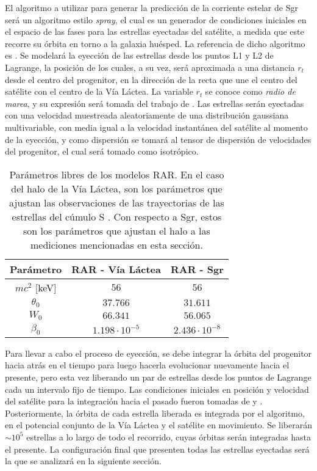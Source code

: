\documentclass[baaa]{baaa}
\begin{document}
El algoritmo a utilizar para generar la predicción de la corriente estelar de Sgr será un algoritmo estilo \textit{spray},  el cual es un generador de condiciones iniciales en el espacio de las fases para las estrellas eyectadas del satélite, a medida que este recorre su órbita en torno a la galaxia huésped. La referencia de dicho algoritmo es \cite{Gibbons2014}. Se modelará la eyección de las estrellas desde los puntos L1 y L2 de Lagrange, la posición de los cuales, a su vez, será aproximada a una distancia $r_{t}$ desde el centro del progenitor, en la dirección de la recta que une el centro del satélite con el centro de la Vía Láctea. La variable $r_{t}$ se conoce como \textit{radio de marea}, y su expresión será tomada del trabajo de \cite{Gajda2016}. Las estrellas serán eyectadas con una velocidad muestreada aleatoriamente de una distribución gaussiana multivariable, con media igual a la velocidad instantánea del satélite al momento de la eyección, y como dispersión se tomará al tensor de dispersión de velocidades del progenitor, el cual será tomado como isotrópico.

\begin{table}
    \centering
    \begin{tabular}{c|c|c}
        \hline
        \textbf{Parámetro} & \textbf{RAR - Vía Láctea} & \textbf{RAR - Sgr} \\
        \hline
        $mc^{2}$ [keV] & $56$ & $56$ \\
        $\theta_{0}$ & $37.766$ & $31.611$ \\
        $W_{0}$ & $66.341$ & $56.065$ \\
        $\beta_{0}$ & $1.198\cdot 10^{-5}$ & $2.436\cdot 10^{-8}$ \\
        \hline
    \end{tabular}
    \caption{Parámetros libres de los modelos RAR. En el caso del halo de la Vía Láctea, son los parámetros que ajustan las observaciones de las trayectorias de las estrellas del cúmulo S \citep{BecerraVergara2020, BecerraVergara2021}. Con respecto a Sgr, estos son los parámetros que ajustan el halo a las mediciones mencionadas en esta sección.}
    \label{tab:rar_best_fit_parameters}
\end{table}

Para llevar a cabo el proceso de eyección, se debe integrar la órbita del progenitor hacia atrás en el tiempo para luego hacerla evolucionar nuevamente hacia el presente, pero esta vez liberando un par de estrellas desde los puntos de Lagrange cada un intervalo fijo de tiempo. Las condiciones iniciales en posición y velocidad del satélite para la integración hacia el pasado fueron tomadas de \cite{Gibbons2014} y \cite{Vasiliev2020}. Posteriormente, la órbita de cada estrella liberada es integrada por el algoritmo, en el potencial conjunto de la Vía Láctea y el satélite en movimiento. Se liberarán $\sim 10^{5}$ estrellas a lo largo de todo el recorrido, cuyas órbitas serán integradas hasta el presente. La configuración final que presenten todas las estrellas eyectadas será la que se analizará en la siguiente sección.
\end{document}
